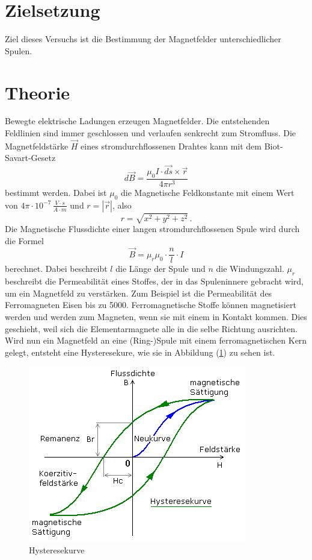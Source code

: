 \setcounter{page}{1}
\section{Zielsetzung}
Ziel dieses Versuchs ist die Bestimmung der Magnetfelder unterschiedlicher Spulen.
\section{Theorie}
 Bewegte elektrische Ladungen erzeugen Magnetfelder.
 Die entstehenden Feldlinien sind immer geschlossen und verlaufen senkrecht zum Stromfluss.
 Die Magnetfeldstärke $\overrightarrow{H}$ eines stromdurchflossenen Drahtes
 kann mit dem Biot-Savart-Gesetz
 \begin{equation}
   d\overrightarrow{B} = \frac{\mu_{0}I\cdot \overrightarrow{ds} \times
   \overrightarrow{r}}{4 \pi r^3}
 \end{equation}
 bestimmt werden.
 Dabei ist $\mu_0$ die Magnetische Feldkonstante mit einem Wert von
 $4\pi \cdot 10^{-7}\, \frac{V \cdot s}{A\cdot m}$ und $r = |\overrightarrow{r}|$, also
 \begin{equation*}
   r = \sqrt{x^2 +y^2 +z^2} \,.
 \end{equation*}
Die Magnetische Flussdichte einer langen stromdurchflossenen Spule wird durch die Formel
\begin{equation}
  \overrightarrow{B}= \mu_r \mu_0 \cdot \frac{n}{l}\cdot I
  \label{eqn:2}
\end{equation}
berechnet.
Dabei beschreibt $l$ die Länge der Spule und $n$ die Windungszahl.
$\mu_r$ beschreibt die Permeabilität eines Stoffes,
der in das Spuleninnere gebracht wird, um ein Magnetfeld zu verstärken.
Zum Beispiel ist die Permeabilität des Ferromagneten Eisen bis zu 5000.
Ferromagnetische Stoffe können magnetisiert werden und werden zum Magneten,
wenn sie mit einem in Kontakt kommen.
Dies geschieht, weil sich die Elementarmagnete alle
in die selbe Richtung ausrichten.\cite{on1}\\
Wird nun ein Magnetfeld an eine (Ring-)Spule mit einem ferromagnetischen Kern gelegt,
entsteht eine Hysteresekure, wie sie in Abbildung (\ref{fig:hys1}) zu sehen ist.
\begin{figure}[H]
\centering
\includegraphics[scale=0.8]{hysteresekurve.png}
\caption{Hysteresekurve\protect\cite{on2}}
\label{fig:hys1}
\end{figure}

